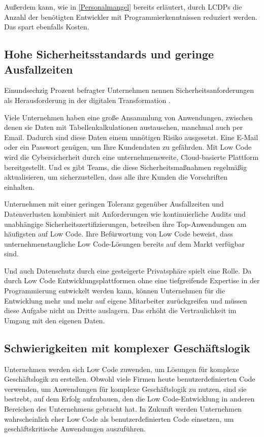 \documentclass[12pt]{article} %
\begin{document}
	Außerdem kann, wie in \ref{Personalmangel} bereits erläutert, durch LCDPs die Anzahl der benötigten Entwickler mit Programmierkenntnissen reduziert werden. Das spart ebenfalls Kosten.  
	
	\subsection{Hohe Sicherheitsstandards und geringe Ausfallzeiten} 
	Einundsechzig Prozent befragter Unternehmen nennen Sicherheitsanforderungen als Herausforderung in der digitalen Transformation \autocite{EmmaVanPelt.2019}. \newline  %
	
	Viele Unternehmen haben eine große Ansammlung von Anwendungen, zwischen denen sie Daten mit Tabellenkalkulationen austauschen, manchmal auch per Email. Dadurch sind diese Daten einem unnötigen Risiko ausgesetzt. Eine E-Mail oder ein Passwort genügen, um Ihre Kundendaten zu gefährden. Mit Low Code wird die Cybersicherheit durch eine unternehmensweite, Cloud-basierte Plattform bereitgestellt. Und es gibt Teams, die diese Sicherheitsmaßnahmen regelmäßig aktualisieren, um sicherzustellen, dass alle ihre Kunden die Vorschriften einhalten. \autocite{KevinShuler.2023} \newline
	
	Unternehmen mit einer geringen Toleranz gegenüber Ausfallzeiten und Datenverlusten kombiniert mit Anforderungen wie kontinuierliche Audits und unabhängige Sicherheitszertifizierungen, betreiben ihre Top-Anwendungen am häufigsten auf Low Code. Ihre Befürwortung von Low Code beweist, dass unternehmenstaugliche Low Code-Lösungen bereits auf dem Markt verfügbar sind. \autocite{EmmaVanPelt.2019} \newline
	
	Und auch Datenschutz durch eine gesteigerte Privatsphäre spielt eine Rolle. Da durch Low Code Entwicklungsplattformen ohne eine tiefgreifende Expertise in der Programmierung entwickelt werden kann, können Unternehmen für die Entwicklung mehr und mehr auf eigene Mitarbeiter zurückgreifen und müssen diese Aufgabe nicht an Dritte auslagern. Das erhöht die Vertraulichkeit im Umgang mit den eigenen Daten. \autocite{Sanchis.2020b}
	
	\subsection{Schwierigkeiten mit komplexer Geschäftslogik}
	Unternehmen werden sich Low Code zuwenden, um Lösungen für komplexe Geschäftslogik zu erstellen. Obwohl viele Firmen heute benutzerdefinierten Code verwenden, um Anwendungen für komplexe Geschäftslogik zu nutzen, sind sie bestrebt, auf dem Erfolg aufzubauen, den die Low Code-Entwicklung in anderen Bereichen des Unternehmens gebracht hat. In Zukunft werden Unternehmen wahrscheinlich eher Low Code als benutzerdefinierten Code einsetzen, um geschäftskritische Anwendungen auszuführen. \autocite{EmmaVanPelt.2019}
		
\end{document}
